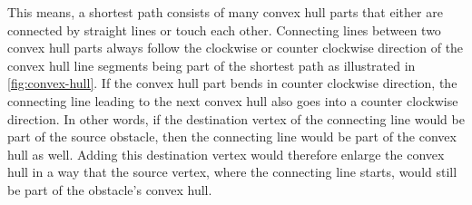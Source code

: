			This means, a shortest path consists of many convex hull parts that either are connected by straight lines or touch each other.
			Connecting lines between two convex hull parts always follow the clockwise or counter clockwise direction of the convex hull line segments being part of the shortest path as illustrated in \cref{fig:convex-hull}.
			If the convex hull part bends in counter clockwise direction, the connecting line leading to the next convex hull also goes into a counter clockwise direction.
			In other words, if the destination vertex of the connecting line would be part of the source obstacle, then the connecting line would be part of the convex hull as well.
			Adding this destination vertex would therefore enlarge the convex hull in a way that the source vertex, where the connecting line starts, would still be part of the obstacle's convex hull.

